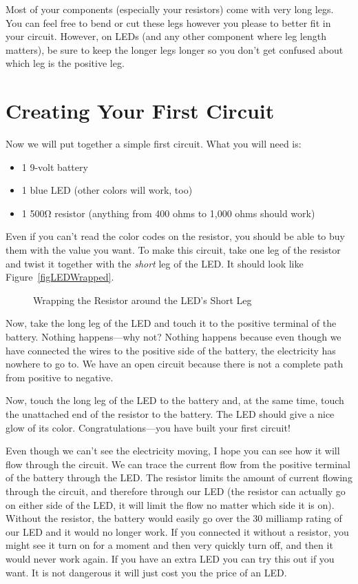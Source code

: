 Most of your components (especially your resistors) come with very long legs.
You can feel free to bend or cut these legs however you please to better fit in your circuit.
However, on LEDs (and any other component where leg length matters), be sure to keep the longer legs longer so you don't get confused about which leg is the positive leg.

\section{Creating Your First Circuit}

Now we will put together a simple first circuit.
What you will need is:
\begin{itemize}
\item 1 9-volt battery
\item 1 blue LED (other colors will work, too)
\item 1 500\si{\ohm} resistor (anything from 400 ohms to 1,000 ohms should work)
\end{itemize}

Even if you can't read the color codes on the resistor, you should be able to buy them with the value you want.
To make this circuit, take one leg of the resistor and twist it together with the \emph{short} leg of the LED.
It should look like Figure~\ref{figLEDWrapped}.

\begin{figure}
\caption{Wrapping the Resistor around the LED's Short Leg}
\end{figure}

Now, take the long leg of the LED and touch it to the positive terminal of the battery.
Nothing happens---why not?
Nothing happens because even though we have connected the wires to the positive side of the battery, the electricity has nowhere to go to.
We have an open circuit because there is not a complete path from positive to negative.

Now, touch the long leg of the LED to the battery and, at the same time, touch the unattached end of the resistor to the battery.
The LED should give a nice glow of its color.
Congratulations---you have built your first circuit!

Even though we can't see the electricity moving, I hope you can see how it will flow through the circuit.
We can trace the current flow from the positive terminal of the battery through the LED.
The resistor limits the amount of current flowing through the circuit, and therefore through our LED (the resistor can actually go on either side of the LED, it will limit the flow no matter which side it is on).
Without the resistor, the battery would easily go over the 30 milliamp rating of our LED and it would no longer work.  
If you connected it without a resistor, you might see it turn on for a moment and then very quickly turn off, and then it would never work again.
If you have an extra LED you can try this out if you want.
It is not dangerous it will just cost you the price of an LED.

